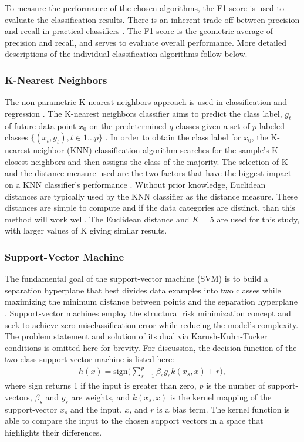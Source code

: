 To measure the performance of the chosen algorithms, the F1 score is 
used to evaluate the classification results. 
There is an inherent trade-off between precision and recall in practical classifiers \cite{buckland94}.
The F1 score is the geometric average of
precision and recall, and serves to evaluate overall performance. 
More detailed descriptions of the individual classification algorithms follow below.

\subsubsection{K-Nearest Neighbors}

The non-parametric K-nearest neighbors approach is used in classification 
and regression \cite{Vaishnnave12019}.
The K-nearest neighbors classifier aims to predict the class label, $g_t$ of 
future data point $x_0$ on the predetermined $q$ classes given a set 
of $p$ labeled classes $\{(x_t, g_t), t \in 1 \ldots p\}$ \cite{Song2007}. 
In order to obtain the class label for $x_0$, the K-nearest neighbor (KNN)
 classification algorithm searches for the sample's K closest neighbors 
 and then assigns the class of the majority.
The selection of K and the distance measure used are the two factors 
that have the biggest impact on a KNN classifier's performance \cite{Alf2019}. 
Without prior knowledge, Euclidean distances are typically used by the KNN classifier 
as the distance measure. These distances are simple to compute and if the data
categories are distinct, than this method will work well.
The Euclidean distance and $K=5$ are used for this study, with larger values of K giving similar results.

\subsubsection{Support-Vector Machine}

The fundamental goal of the support-vector machine (SVM) is to build a separation hyperplane that best divides
 data examples into two classes while maximizing the minimum distance between points
 and the separation hyperplane \cite{lazarevic2009support}. 
Support-vector machines employ the structural risk minimization \cite{sewell2008structural}
 concept and seek to achieve zero misclassification error while reducing the 
 model's complexity. 
The problem statement and solution of its dual via Karush-Kuhn-Tucker conditions \cite{Lange2013}
is omitted here for brevity. 
For discussion, the decision function of the two class support-vector machine is listed here:
\begin{align}
h(x) = \mathrm{sign} \bigg( \sum_{s=1}^p \beta_s g_s k(x_s, x) + r \bigg),
\end{align}
where sign returns 1 if the input is greater than zero, $p$ is the number of support-vectors, 
$\beta_s$ and $g_s$ are weights, and $k(x_s, x)$ is the kernel mapping of the support-vector $x_s$ and the input, $x$, and $r$ is a bias term.
The kernel function is able to compare the input to the chosen support vectors in a space that highlights their differences.

